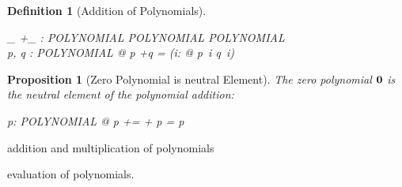 \documentclass[12pt]{scrartcl}
\newtheorem{prop}{Proposition}[section]
\newtheorem{zdef}{Definition}[section]
\begin{document}
\newcommand{\polyplus}{+}
\begin{zdef}[Addition of Polynomials]
  \label{zdef:polynomial-addition}
  \begin{axdef}
    \_ \polyplus \_ : POLYNOMIAL \cross POLYNOMIAL \fun POLYNOMIAL\\
    \where
    \forall p, q : POLYNOMIAL @ p \polyplus q = (\lambda i: \nat @ p~i
    \aplus q~i)
  \end{axdef}
\end{zdef}

\begin{prop}[Zero Polynomial is neutral Element]
  \label{prop:zero-polynomial-neutral-element}
  The zero polynomial $\mathbf{0}$ is the neutral element of the
  polynomial addition:
  \begin{zed}
    \forall p: POLYNOMIAL @ p \polyplus \zeropol = \zeropol \polyplus
    p = p
  \end{zed}
\end{prop}

addition and multiplication of polynomials

evaluation of polynomials.

% 
\printbibliography{}

\end{document}
